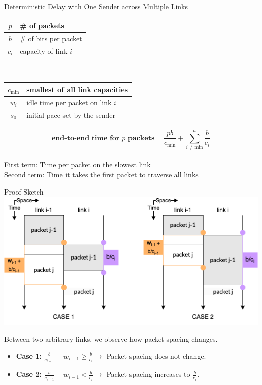 \documentclass[final]{beamer}
\newlength{\colwidth}
\begin{document}
\begin{frame}[t]
\begin{columns}[t]
\begin{column}{\colwidth}
\begin{block}{Deterministic Delay with One Sender across Multiple Links}
    \begin{center}
      \begin{tabular}{| c | l |}
        \hline
        $p$ & \# of packets\\
        \hline
        $b$ & \# of bits per packet\\
        \hline
        $c_i$ & capacity of link $i$\\
        \hline
      \end{tabular} \ \ \ \
      \begin{tabular}{| c | l |}
        \hline
        $c_\mathrm{min}$ & smallest of all link capacities\\
        \hline
        $w_i$ & idle time per packet on link $i$\\
        \hline
        $s_0$ & initial pace set by the sender\\
        \hline
      \end{tabular}
    \end{center}
    
    {\large
    \[\textbf{end-to-end time for $p$ packets} = \frac{pb}{c_\mathrm{min}} + \sum_{i\neq \mathrm{min}}^{n}\frac{b}{c_i}\]}\\
    First term: Time per packet on the slowest link\\
    Second term: Time it takes the first packet to traverse all links
  \end{block}
  \begin{exampleblock}{Proof Sketch}
      \includegraphics[scale=2]{Cases.png}
  
    {\Large Between two arbitrary links, we observe how packet spacing changes.
    \begin{itemize}
      \item \textbf{Case 1:} $\frac{b}{c_{i-1}} + w_{i-1} \geq \frac{b}{c_{i}} \to$ 
      Packet spacing does not change.
      \item \textbf{Case 2:} $\frac{b}{c_{i-1}} + w_{i-1} < \frac{b}{c_{i}} \to$ 
      Packet spacing increases to $\frac{b}{c_i}$.
    \end{itemize}}


\end{exampleblock}
\end{column}
\end{columns}
\end{frame}
\end{document}
